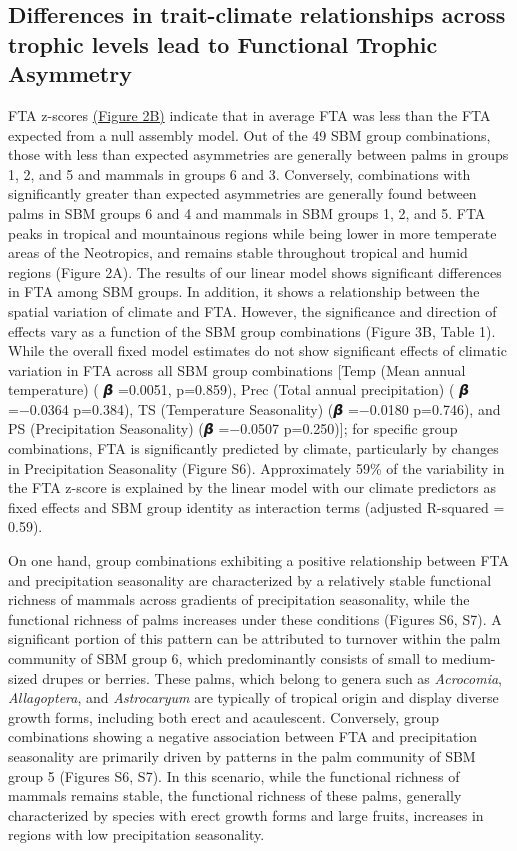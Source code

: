 \documentclass[
]{agujournal2019}
\begin{document}
\subsection{Differences in trait-climate relationships across trophic
levels lead to Functional Trophic
Asymmetry}\label{differences-in-trait-climate-relationships-across-trophic-levels-lead-to-functional-trophic-asymmetry}

FTA z-scores \hyperref[fig2]{(Figure 2B)} indicate that in average FTA
was less than the FTA expected from a null assembly model. Out of the 49
SBM group combinations, those with less than expected asymmetries are
generally between palms in groups 1, 2, and 5 and mammals in groups 6
and 3. Conversely, combinations with significantly greater than expected
asymmetries are generally found between palms in SBM groups 6 and 4 and
mammals in SBM groups 1, 2, and 5. FTA peaks in tropical and mountainous
regions while being lower in more temperate areas of the Neotropics, and
remains stable throughout tropical and humid regions (Figure 2A). The
results of our linear model shows significant differences in FTA among
SBM groups. In addition, it shows a relationship between the spatial
variation of climate and FTA. However, the significance and direction of
effects vary as a function of the SBM group combinations (Figure 3B,
Table 1). While the overall fixed model estimates do not show
significant effects of climatic variation in FTA across all SBM group
combinations {[}Temp (Mean annual temperature) ( 𝞫 =0.0051, p=0.859),
Prec (Total annual precipitation) ( 𝞫 =−0.0364 p=0.384), TS (Temperature
Seasonality) (𝞫 =−0.0180 p=0.746), and PS (Precipitation Seasonality) (𝞫
=−0.0507 p=0.250){]}; for specific group combinations, FTA is
significantly predicted by climate, particularly by changes in
Precipitation Seasonality (Figure S6). Approximately 59\% of the
variability in the FTA z-score is explained by the linear model with our
climate predictors as fixed effects and SBM group identity as
interaction terms (adjusted R-squared = 0.59).

On one hand, group combinations exhibiting a positive relationship
between FTA and precipitation seasonality are characterized by a
relatively stable functional richness of mammals across gradients of
precipitation seasonality, while the functional richness of palms
increases under these conditions (Figures S6, S7). A significant portion
of this pattern can be attributed to turnover within the palm community
of SBM group 6, which predominantly consists of small to medium-sized
drupes or berries. These palms, which belong to genera such as
\emph{Acrocomia}, \emph{Allagoptera}, and \emph{Astrocaryum} are
typically of tropical origin and display diverse growth forms, including
both erect and acaulescent. Conversely, group combinations showing a
negative association between FTA and precipitation seasonality are
primarily driven by patterns in the palm community of SBM group 5
(Figures S6, S7). In this scenario, while the functional richness of
mammals remains stable, the functional richness of these palms,
generally characterized by species with erect growth forms and large
fruits, increases in regions with low precipitation seasonality.
\end{document}
